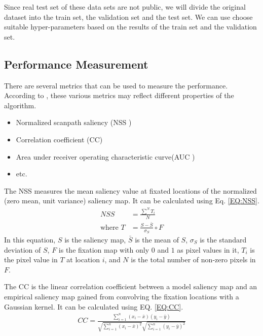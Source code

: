 \documentclass[12pt]{article}
\begin{document}
Since real test set of these data sets are not public, we will divide the original dataset into the train set, the validation set and the test set. We can use choose suitable hyper-parameters based on the results of the train set and the validation set.

\subsection{Performance Measurement}

There are several metrics that can be used to measure the performance. According to \cite{riche2013saliency}, these various metrics may reflect different properties of the algorithm.
\begin{itemize}
    \item Normalized scanpath saliency (NSS \cite{petersComponentsBottomupGaze2005})
    \item Correlation coefficient (CC)
    \item Area under receiver operating characteristic curve(AUC \cite{richeSaliencyHumanFixations2013})
    \item etc.
\end{itemize}

The NSS measures the mean saliency value at fixated locations of the normalized (zero mean, unit variance) saliency map. 
It can be calculated using Eq. \ref{EQ:NSS}. 
\begin{equation}
    \begin{aligned}
        NSS &= \frac{\sum^{N} T_{i}}{N}\\
        \text{where }T &= \frac{S - \bar{S}}{\sigma_{S}} \circ F
    \end{aligned}
    \label{EQ:NSS}
\end{equation}
In this equation, $S$ is the saliency map, $\bar{S}$ is the mean of $S$, $\sigma_{S}$ is 
the standard deviation of $S$, $F$ is the fixation map with only $0$ and $1$ as pixel values in it,
$T_{i}$ is the pixel value in $T$ at location $i$, and $N$ is the total number of non-zero pixels in $F$.

The CC is the linear correlation coefficient between a model saliency map and an empirical saliency map 
gained from convolving the fixation locations with a Gaussian kernel. It can be calculated using EQ. \ref{EQ:CC}. 
\begin{equation}
    \begin{aligned}
        CC = \frac{\sum_{i=1}^{n}(x_{i}-\bar{x})(y_{i}-\bar{y})}
        {\sqrt{\sum_{i=1}^{n}(x_{i}-\bar{x})^{2}}\sqrt{\sum_{i=1}^{n}(y_{i}-\bar{y})^{2}}}
    \end{aligned}
    \label{EQ:CC}
\end{equation}
\end{document}
